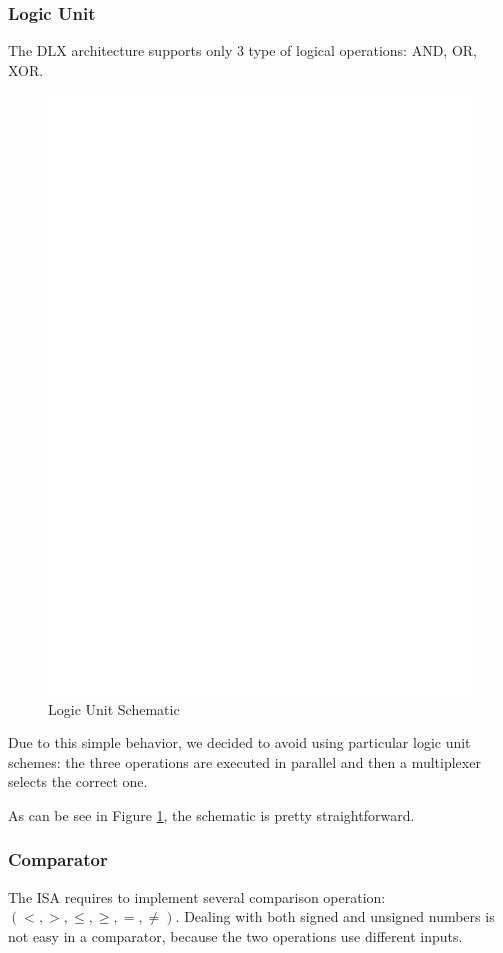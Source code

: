 \documentclass[12pt]{article}
\begin{document}
\subsubsection{Logic Unit}
The DLX architecture supports only 3 type of logical operations: AND, OR, XOR. 
\begin{figure}[h]
	\includegraphics[center]{images/LOGIC_UNIT.eps}
	\caption{Logic Unit Schematic}
	\label{LU}
\end{figure}
Due to this simple behavior, we decided to avoid using particular logic unit schemes: the three operations are executed in parallel and then a multiplexer selects the correct one. 

As can be see in Figure \ref{LU}, the schematic is pretty straightforward.


\subsubsection{Comparator}
The ISA requires to implement several comparison operation: $(<, >, \leq, \geq, =, \neq)$.
Dealing with both signed and unsigned numbers is not easy in a comparator, because the two operations use different inputs.
\end{document}
